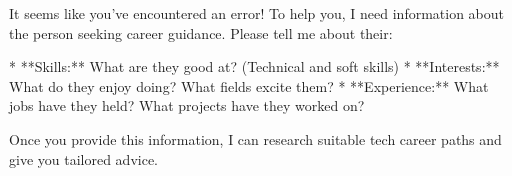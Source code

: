 It seems like you've encountered an error!  To help you, I need information about the person seeking career guidance. Please tell me about their:

*   **Skills:** What are they good at? (Technical and soft skills)
*   **Interests:** What do they enjoy doing? What fields excite them?
*   **Experience:** What jobs have they held? What projects have they worked on?

Once you provide this information, I can research suitable tech career paths and give you tailored advice.